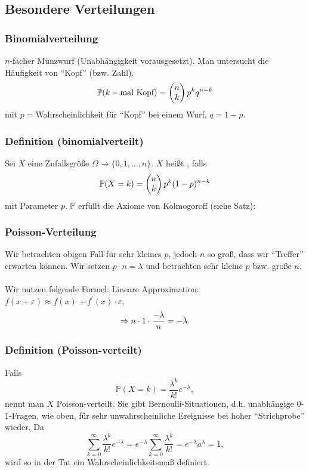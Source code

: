 \subsection{Besondere Verteilungen}
\subsubsection{Binomialverteilung}
$n$-facher M\"unzwurf (Unabh\"angigkeit vorausgesetzt). Man untersucht die H\"aufigkeit von ``Kopf'' (bzw. Zahl).
\[
\mathbb{P}(k-\text{mal Kopf})=\begin{pmatrix}n\\k\end{pmatrix}p^kq^{n-k}
\]
mit $p=$Wahrscheinlichkeit f\"ur ``Kopf'' bei einem Wurf, $q=1-p$.
\subsubsection{Definition (binomialverteilt)}
Sei $X$ eine Zufallsgr\"o\ss{}e $\Omega\to\{0,1,\ldots,n\}$. $X$ hei\ss{}t , falls
\[
\mathbb{P}(X=k)=\begin{pmatrix}n\\k\end{pmatrix}p^k(1-p)^{n-k}
\]
mit Parameter $p$. $\mathbb{P}$ erf\"ullt die Axiome von Kolmogoroff (siehe Satz):
\subsubsection{Poisson-Verteilung}
Wir betrachten obigen Fall f\"ur sehr kleines $p$, jedoch $n$ so gro\ss{}, dass wir ``Treffer'' erwarten k\"onnen. Wir setzen $p\cdot n=\lambda$ und betrachten sehr kleine $p$ bzw. gro\ss{}e $n$.
\\~\\
Wir nutzen folgende Formel:
Lineare Approximation: $f(x+\varepsilon)\approx f(x)+f^\prime(x)\cdot\varepsilon$,
\[
\Rightarrow n\cdot1\cdot\frac{-\lambda}{n}=-\lambda.
\]
\subsubsection{Definition (Poisson-verteilt)}
Falls
\[\mathbb{P}(X=k)=\frac{\lambda^k}{k!}e^{-\lambda},\]
nennt man $X$ Poisson-verteilt. Sie gibt Bernoulli-Situationen, d.h. unabh\"angige $0$-$1$-Fragen, wie oben, f\"ur sehr unwahrscheinliche Ereignisse bei hoher ``Strichprobe'' wieder. Da
\[
\sum_{k=0}^\infty\frac{\lambda^k}{k!}e^{-\lambda}=e^{-\lambda}\sum_{k=0}^\infty\frac{\lambda^k}{k!}=e^{-\lambda}a^{\lambda}=1,
\]
wird so in der Tat ein Wahrscheinlichkeitsma\ss{} definiert.
